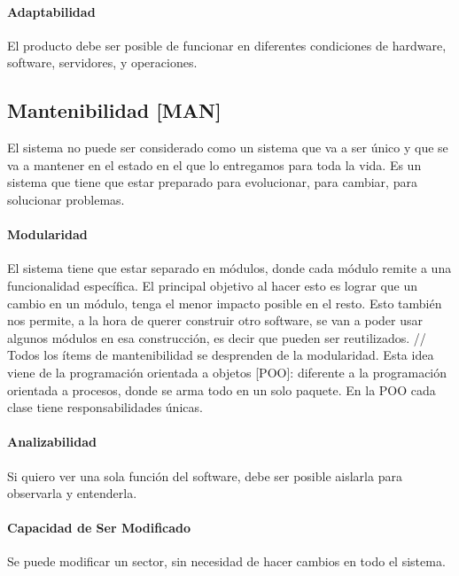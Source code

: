 \hypertarget{adaptabilidad}{%
\paragraph{Adaptabilidad}\label{adaptabilidad}}
El producto debe ser posible de funcionar en
diferentes condiciones de hardware, software, servidores, y operaciones.

\hypertarget{mantenibilidad-man}{%
\subsection{Mantenibilidad {[}MAN{]}}\label{mantenibilidad-man}}

El sistema no puede ser considerado como un sistema que va a ser único y
que se va a mantener en el estado en el que lo entregamos para toda la
vida. Es un sistema que tiene que estar preparado para evolucionar, para
cambiar, para solucionar problemas.

\hypertarget{modularidad}{%
\paragraph{Modularidad}\label{modularidad}}
El sistema tiene que estar separado en módulos,
  donde cada módulo remite a una funcionalidad específica. El principal
  objetivo al hacer esto es lograr que un cambio en un módulo, tenga el
  menor impacto posible en el resto. Esto también nos permite, a la hora
  de querer construir otro software, se van a poder usar algunos módulos
  en esa construcción, es decir que pueden ser reutilizados. // Todos
  los ítems de mantenibilidad se desprenden de la modularidad. Esta idea
  viene de la programación orientada a objetos {[}POO{]}: diferente a la
  programación orientada a procesos, donde se arma todo en un solo
  paquete. En la POO cada clase tiene responsabilidades únicas.

\hypertarget{analizabilidad}{%
\paragraph{Analizabilidad}\label{analizabilidad}}
Si quiero ver una sola función del software,
  debe ser posible aislarla para observarla y entenderla.

\hypertarget{modificable}{%
\paragraph{Capacidad de Ser Modificado}\label{modificable}}
Se puede modificar un sector,
  sin necesidad de hacer cambios en todo el sistema.

